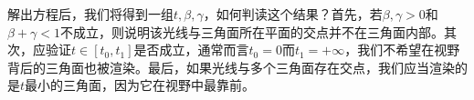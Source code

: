 解出方程后，我们将得到一组$t,\beta,\gamma$，如何判读这个结果？首先，若$\beta,\gamma>0$和$\beta+\gamma<1$不成立，则说明该光线与三角面所在平面的交点并不在三角面内部。其次，应验证$t\in[t_0,t_1]$是否成立，通常而言$t_0=0$而$t_1=+\infty$，我们不希望在视野背后的三角面也被渲染。最后，如果光线与多个三角面存在交点，我们应当渲染的是$t$最小的三角面，因为它在视野中最靠前。

